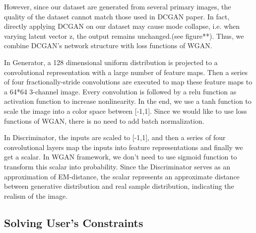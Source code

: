However, since our dataset are generated from several primary images, the quality of the dataset cannot match those used in DCGAN paper. In fact, directly applying DCGAN on our dataset may cause mode collapse, i.e. when varying latent vector z, the output remains unchanged.(see figure**). Thus, we combine DCGAN's network structure with loss functions of WGAN.

In Generator, a 128 dimensional uniform distribution is projected to a convolutional representation with a large number of feature maps. Then a series of four fractionally-stride convolutions are executed to map these feature maps to a 64*64 3-channel image. Every convolution is followed by a relu function as activation function to increase nonlinearity. In the end, we use a tanh function to scale the image into a color space between [-1,1]. Since we would like to use loss functions of WGAN, there is no need to add batch normalization.

In Discriminator, the inputs are scaled to [-1,1], and then a series of four convolutional layers map the inputs into feature representations and finally we get a scalar. In WGAN framework, we don’t need to use sigmoid function to transform this scalar into probability. Since the Discriminator serves as an approximation of EM-distance, the scalar represents an approximate distance between generative distribution and real sample distribution, indicating the realism of the image.




\subsection{Solving User’s Constraints}

